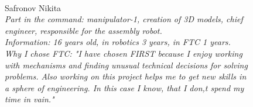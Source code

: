 \begin{figure}[H]
	\vfill
	\begin{minipage}{0.47\linewidth}
		\\
	\end{minipage}
	\hfill
	\begin{minipage}{0.47\linewidth}
		Safronov Nikita\\
		\emph{Part in the command: manipulator-1,  creation of 3D models, chief engineer, responsible for the assembly robot.\\}
		\emph{Information: 16 years old, in robotics 3 years, in FTC 1 years.\\} 
		\emph{Why I chose FTC: "I have chosen FIRST because I enjoy working with mechanisms and finding unusual technical decisions for solving problems. Also working on this project helps me to get new skills in a sphere of engineering. In this case I know, that I don,t spend my time in vain."}				
	\end{minipage}
\end{figure}

